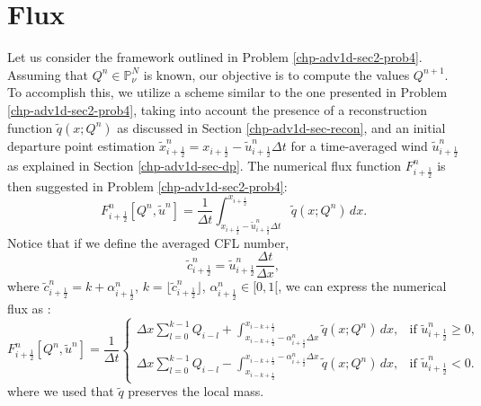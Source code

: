 \section{Flux}
\label{chp-adv1d-sec-flux}
Let us consider the framework outlined in Problem \ref{chp-adv1d-sec2-prob4}.
Assuming that $Q^{n} \in \mathbb{P}^{N}_{\nu}$ is known, our objective is to compute the values $Q^{n+1}$.
To accomplish this, we utilize a scheme similar to the one presented in Problem \ref{chp-adv1d-sec2-prob4},
taking into account the presence of a reconstruction function $\tilde{q}(x;Q^n)$ as discussed in Section
\ref{chp-adv1d-sec-recon}, and an initial departure point estimation
$\tilde{x}_{i+\frac{1}{2}}^n = {x}_{i+\frac{1}{2}} -\tilde{u}_{i+\frac{1}{2}}^n \Delta t$
for a time-averaged wind $\tilde{u}_{i+\frac{1}{2}}^n$ as explained in Section \ref{chp-adv1d-sec-dp}.
The numerical flux function ${F}^{n}_{i+\frac{1}{2}}$ is then suggested in Problem \ref{chp-adv1d-sec2-prob4}:
\begin{equation}
	\label{chp-sec-flux:numerical-flux1}
	{F}^{n}_{i+\frac{1}{2}}[Q^n,\tilde{u}^n]  = \frac{1}{\Delta t}
	\int_{x_{i+\frac{1}{2}}-\tilde{u}^n_{i+\frac{1}{2}}\Delta t}^{x_{i+\frac{1}{2}}}
	\tilde{q}(x;Q^n) \,dx.
\end{equation}
Notice that if we define the averaged CFL number,
\begin{equation*}
	\label{chp-sec-flux:cedges}
	\tilde{c}_{i+\frac{1}{2}}^n = \tilde{u}_{i+\frac{1}{2}}^n\frac{\Delta t}{\Delta x},
\end{equation*}
where $\tilde{c}_{i+\frac{1}{2}}^n = k + \alpha_{i+\frac{1}{2}}^n$, $k = \lfloor \tilde{c}_{i+\frac{1}{2}}^n \rfloor$,
$\alpha_{i+\frac{1}{2}}^n \in [0,1[$,
we can express the numerical flux as \citep{lin:1996, chen:2017}:
\begin{equation}
	\label{chp-sec-flux:numerical-flux}
	{F}_{i+\frac{1}{2}}^n[Q^n,\tilde{u}^n] =  \frac{1}{\Delta t}
	\begin{cases}
	\Delta x\sum_{l=0}^{k-1} Q_{i-l} +  
    \int_{x_{i-k+\frac{1}{2}}-{\alpha}^n_{i+\frac{1}{2}}\Delta x}^{x_{i-k+\frac{1}{2}}}
    \tilde{q}(x;Q^n) \,dx, & \text{if } \tilde{u}_{i+\frac{1}{2}}^n \geq 0,\\
	\Delta x\sum_{l=0}^{k-1} Q_{i-l} -  
    \int^{x_{i-k+\frac{1}{2}}-{\alpha}^n_{i+\frac{1}{2}}\Delta x}_{x_{i-k+\frac{1}{2}}}
    \tilde{q}(x;Q^n) \,dx, & \text{if } \tilde{u}_{i+\frac{1}{2}}^n < 0.
	\end{cases}
\end{equation}
where we used that $\tilde{q}$ preserves the local mass.

